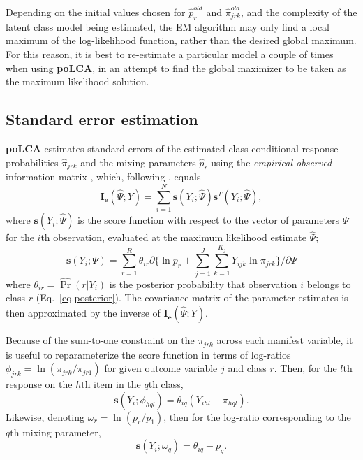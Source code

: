 \documentclass[letterpaper,12pt]{article}
\begin{document}
Depending on the initial values chosen for $\hat{p}_r^{old}$ and $\hat \pi_{jrk}^{old}$, and the complexity of the latent class model being estimated, the EM algorithm may only find a local maximum of the log-likelihood function, rather than the desired global maximum.  For this reason, it is best to re-estimate a particular model a couple of times when using \textbf{poLCA}, in an attempt to find the global maximizer to be taken as the maximum likelihood solution.

\subsection{Standard error estimation} \label{s.lc-se}

\textbf{poLCA} estimates standard errors of the estimated class-conditional response probabilities $\hat \pi_{jrk}$ and the mixing parameters $\hat p_r$ using the \emph{empirical observed} information matrix \citep{Meilijson1989}, which, following \citet[66]{McLachlanPeel2000}, equals
\begin{equation}
\boldsymbol{I_e}(\hat \Psi;Y) = \sum_{i=1}^N \boldsymbol{s}(Y_i;\hat
\Psi)\boldsymbol{s}^T(Y_i;\hat \Psi), \label{eq.I_e}
\end{equation}
where $\boldsymbol{s}(Y_i;\hat \Psi)$ is the score function with respect to the vector of parameters $\Psi$ for the $i$th observation, evaluated at the maximum likelihood estimate $\hat \Psi$;
\begin{equation}
\boldsymbol{s}(Y_i;\Psi) = \sum_{r=1}^R \theta_{ir} \partial \{ \ln
p_r + \sum_{j=1}^J \sum_{k=1}^{K_j} Y_{ijk} \ln \pi_{jrk} \} /
\partial \Psi \label{eq.score}
\end{equation}
where $\theta_{ir}=\widehat{\Pr}(r|Y_i)$ is the posterior probability that observation $i$ belongs to class $r$ (Eq.~\ref{eq.posterior}). The covariance matrix of the parameter estimates is then approximated by the inverse of $\boldsymbol{I_e}(\hat \Psi;Y)$.

Because of the sum-to-one constraint on the $\pi_{jrk}$ across each manifest variable, it is useful to reparameterize the score function in terms of log-ratios $\phi_{jrk} = \ln (\pi_{jrk} / \pi_{jr1})$ for given outcome variable $j$ and class $r$. Then, for the $l$th response on the $h$th item in the $q$th class,
\begin{equation}
\boldsymbol{s}(Y_i;\phi_{hql}) = \theta_{iq} ( Y_{ihl} - \pi_{hql}).
\label{eq.score_phi}
\end{equation}
Likewise, denoting $\omega_r = \ln (p_r/p_1)$, then for the log-ratio corresponding to the $q$th mixing parameter,
\begin{equation}
\boldsymbol{s}(Y_i;\omega_q) = \theta_{iq} - p_{q}.
\label{eq.score_omega}
\end{equation}
\end{document}
